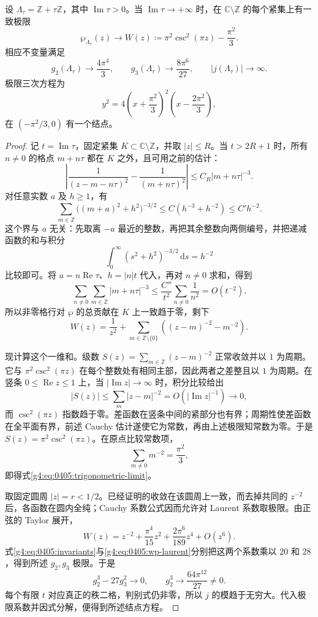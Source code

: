 \begin{proposition}\label{g4:prop:0405:trigonometric-limit}
	设 \(\Lambda_\tau=\mathbb Z+\tau\mathbb Z\)，其中 \(\operatorname{Im}\tau>0\)。当 \(\operatorname{Im}\tau\to+\infty\) 时，在 \(\mathbb C\setminus\mathbb Z\) 的每个紧集上有一致极限
	\begin{equation}\label{g4:eq:0405:trigonometric-limit}
		\wp_{\Lambda_\tau}(z)\longrightarrow
		W(z)\coloneqq\pi^2\csc^2(\pi z)-\frac{\pi^2}{3}.
	\end{equation}
	相应不变量满足
	\[
		g_2(\Lambda_\tau)\longrightarrow\frac{4\pi^4}{3},
		\qquad
		g_3(\Lambda_\tau)\longrightarrow\frac{8\pi^6}{27},
		\qquad |j(\Lambda_\tau)|\longrightarrow\infty.
	\]
	极限三次方程为
	\[
		y^2=4\left(x+\frac{\pi^2}{3}\right)^2
			\left(x-\frac{2\pi^2}{3}\right),
	\]
	在 \((-\pi^2/3,0)\) 有一个结点。
\end{proposition}
\begin{proof}
	记 \(t=\operatorname{Im}\tau\)，固定紧集 \(K\subset\mathbb C\setminus\mathbb Z\)，并取 \(|z|\le R\)。当 \(t>2R+1\) 时，所有 \(n\ne0\) 的格点 \(m+n\tau\) 都在 \(K\) 之外，且可用之前的估计：
	\[
		\left|\frac1{(z-m-n\tau)^2}-\frac1{(m+n\tau)^2}\right|
		\le C_R|m+n\tau|^{-3}.
	\]
	对任意实数 \(a\) 及 \(h\ge1\)，有
	\[
		\sum_{m\in\mathbb Z}
		\bigl((m+a)^2+h^2\bigr)^{-3/2}
		\le C(h^{-3}+h^{-2})\le C' h^{-2}.
	\]
	这个界与 \(a\) 无关：先取离 \(-a\) 最近的整数，再把其余整数向两侧编号，并把递减函数的和与积分
	\[
		\int_0^\infty(s^2+h^2)^{-3/2}\,\mathrm{d}s=h^{-2}
	\]
	比较即可。将 \(a=n\operatorname{Re}\tau\)、\(h=|n|t\) 代入，再对 \(n\ne0\) 求和，得到
	\[
		\sum_{n\ne0}\sum_{m\in\mathbb Z}|m+n\tau|^{-3}
		\le\frac{C''}{t^2}\sum_{n\ne0}\frac1{n^2}
		=O(t^{-2}).
	\]
	所以非零格行对 \(\wp\) 的总贡献在 \(K\) 上一致趋于零，剩下
	\[
		W(z)=\frac1{z^2}
		+\sum_{m\in\mathbb Z\setminus\{0\}}
		\left((z-m)^{-2}-m^{-2}\right).
	\]

	现计算这个一维和。级数
	\(S(z)=\sum_{m\in\mathbb Z}(z-m)^{-2}\) 正常收敛并以 \(1\) 为周期。它与 \(\pi^2\csc^2(\pi z)\) 在每个整数处有相同主部，因此两者之差整且以 \(1\) 为周期。在竖条 \(0\le\operatorname{Re}z\le1\) 上，当 \(|\operatorname{Im}z|\to\infty\) 时，积分比较给出
	\[
		|S(z)|\le \sum_m|z-m|^{-2}
		=O(|\operatorname{Im}z|^{-1})\longrightarrow0,
	\]
	而 \(\csc^2(\pi z)\) 指数趋于零。差函数在竖条中间的紧部分也有界；周期性使差函数在全平面有界，前述 Cauchy 估计遂使它为常数，再由上述极限知常数为零。于是 \(S(z)=\pi^2\csc^2(\pi z)\)。在原点比较常数项，
	\[
		\sum_{m\ne0}m^{-2}=\frac{\pi^2}{3},
	\]
	即得式\eqref{g4:eq:0405:trigonometric-limit}。

	取固定圆周 \(|z|=r<1/2\)。已经证明的收敛在该圆周上一致，而去掉共同的 \(z^{-2}\) 后，各函数在圆内全纯；Cauchy 系数公式因而允许对 Laurent 系数取极限。由正弦的 Taylor 展开，
	\[
		W(z)=z^{-2}+\frac{\pi^4}{15}z^2
			+\frac{2\pi^6}{189}z^4+O(z^6).
	\]
	式\eqref{g4:eq:0405:invariants}与\eqref{g4:eq:0405:wp-laurent}分别把这两个系数乘以 \(20\) 和 \(28\)，得到所述 \(g_2,g_3\) 极限。于是
	\[
		g_2^3-27g_3^2\longrightarrow0,\qquad
		g_2^3\longrightarrow\frac{64\pi^{12}}{27}\ne0.
	\]
	每个有限 \(t\) 对应真正的秩二格，判别式仍非零，所以 \(j\) 的模趋于无穷大。代入极限系数并因式分解，便得到所述结点方程。
\end{proof}

